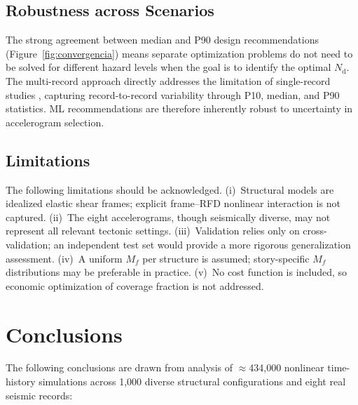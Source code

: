 \documentclass[preprint,12pt,authoryear]{elsarticle}
\newcommand{\nd}{N_{\mathrm{d}}}
\newcommand{\Mf}{M_{\!f}}
\begin{document}
\subsection{Robustness across Scenarios}

The strong agreement between median and P90 design recommendations
(Figure~\ref{fig:convergencia}) means separate optimization problems do not need to be
solved for different hazard levels when the goal is to identify the optimal $\nd$. The
multi-record approach directly addresses the limitation of single-record studies
\citep{Jarrahi2020jbe,Jarrahi2020sdee}, capturing record-to-record variability through
P10, median, and P90 statistics. ML recommendations are therefore inherently robust to
uncertainty in accelerogram selection.

\subsection{Limitations}

The following limitations should be acknowledged. (i)~Structural models are idealized
elastic shear frames; explicit frame--RFD nonlinear interaction is not captured.
(ii)~The eight accelerograms, though seismically diverse, may not represent all relevant
tectonic settings. (iii)~Validation relies only on cross-validation; an independent test
set would provide a more rigorous generalization assessment. (iv)~A uniform $\Mf$ per
structure is assumed; story-specific $\Mf$ distributions may be preferable in practice.
(v)~No cost function is included, so economic optimization of coverage fraction is not
addressed.

\section{Conclusions}
\label{sec:conclusions}

The following conclusions are drawn from analysis of $\approx$434,000 nonlinear
time-history simulations across 1,000 diverse structural configurations and eight real
seismic records:
\end{document}
